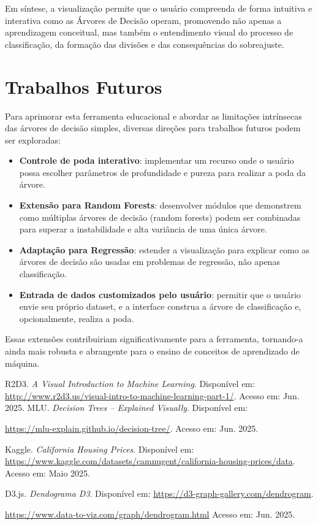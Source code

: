 \documentclass[conference]{IEEEtran}
\begin{document}
Em síntese, a visualização permite que o usuário compreenda de forma intuitiva e interativa como as Árvores de Decisão operam, promovendo não apenas a aprendizagem conceitual, mas também o entendimento visual do processo de classificação, da formação das divisões e das consequências do sobreajuste.

\section{Trabalhos Futuros}
Para aprimorar esta ferramenta educacional e abordar as limitações intrínsecas das árvores de decisão simples, diversas direções para trabalhos futuros podem ser exploradas:
\begin{itemize}
    \item \textbf{Controle de poda interativo}: implementar um recurso onde o usuário possa escolher parâmetros de profundidade e pureza para realizar a poda da árvore.
    \item \textbf{Extensão para Random Forests}: desenvolver módulos que demonstrem como múltiplas árvores de decisão (random forests) podem ser combinadas para superar a instabilidade e alta variância de uma única árvore.
    \item \textbf{Adaptação para Regressão}: estender a visualização para explicar como as árvores de decisão são usadas em problemas de regressão, não apenas classificação.
    \item \textbf{Entrada de dados customizados pelo usuário}: permitir que o usuário envie seu próprio dataset, e a interface construa a árvore de classificação e, opcionalmente, realiza a poda.
\end{itemize}
Essas extensões contribuiriam significativamente para a ferramenta, tornando-a ainda mais robusta e abrangente para o ensino de conceitos de aprendizado de máquina.

\begin{thebibliography}{00}
 R2D3. \textit{A Visual Introduction to Machine Learning}. Disponível em: \url{http://www.r2d3.us/visual-intro-to-machine-learning-part-1/}. Acesso em: Jun. 2025.
 MLU. \textit{Decision Trees – Explained Visually}. Disponível em:

\url{https://mlu-explain.github.io/decision-tree/}. Acesso em: Jun. 2025.

 Kaggle. \textit{California Housing Prices}. Disponível em: \url{https://www.kaggle.com/datasets/camnugent/california-housing-prices/data}. Acesso em: Maio 2025.

 D3.js. \textit{Dendograma D3}. Disponível em: \url{https://d3-graph-gallery.com/dendrogram}.

\url{https://www.data-to-viz.com/graph/dendrogram.html}
Acesso em: Jun. 2025.

\end{thebibliography}
\end{document}
